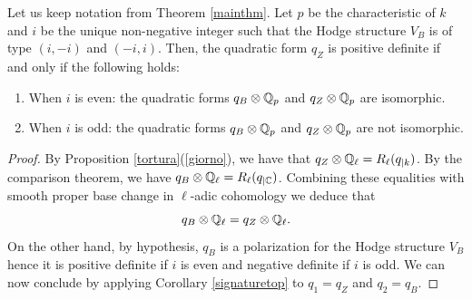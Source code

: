 \begin{prop}
\notready\label{padicreduction}
Let us keep notation from Theorem \ref{mainthm}. Let $p$ be the characteristic of $k$ and $i$ be the unique non-negative integer such that the Hodge structure $V_B$ is of type $(i,-i)$ and  $(-i,i)$. Then, the quadratic form $q_Z$ is positive definite if and only if the  following   holds:
\begin{enumerate}
\item When $i$ is even: the quadratic forms $q_B\otimes \mathbb{Q}_p$ and $q_Z\otimes \mathbb{Q}_p$ are isomorphic.
\item  When $i$ is odd: the quadratic forms $q_B\otimes \mathbb{Q}_p$ and $q_Z\otimes \mathbb{Q}_p$ are not isomorphic.
\end{enumerate}
\end{prop}
\begin{proof}
By  Proposition \ref{tortura}(\ref{giorno}), we have that $q_Z \otimes \mathbb{Q}_\ell = R_\ell(q_{\vert{k}})$. By the comparison theorem, we have $q_B \otimes \mathbb{Q}_\ell = R_\ell(q_{\vert{\mathbb{C}}})$. Combining these equalities with smooth proper base change in $\ell$-adic cohomology   we deduce that \[q_B \otimes \mathbb{Q}_\ell = q_Z \otimes \mathbb{Q}_\ell.\]
On the other hand, by hypothesis, $q_B$ is a polarization for the Hodge structure $V_B$ hence it is positive definite if $i$ is even and negative definite if $i$ is odd. We can now conclude by applying Corollary \ref{signaturetop} to $q_1=q_Z$ and $q_2=q_B$.
\end{proof}
